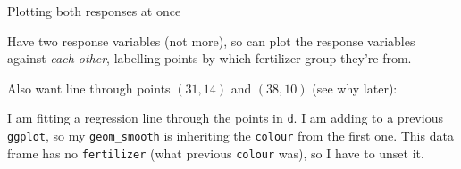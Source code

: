 \begin{frame}[fragile]{Plotting both responses at once}

Have two response variables (not more), so can plot the
response variables against \emph{each other}, labelling points by
which fertilizer group they're from.

\begin{knitrout}
\color{fgcolor}\begin{kframe}
\begin{alltt}
\hlkwb{=}\hlstd{(}\hlopt{+}
  \hlstd{()}
\end{alltt}
\end{kframe}
\end{knitrout}

Also want line through
points $(31,14)$ and $(38,10)$ (see why later):

\begin{knitrout}
\color{fgcolor}\begin{kframe}
\begin{alltt}
\hlkwb{=}\hlstd{(}\hlstd{,}\hlstd{)}
\hlkwb{=}\hlstd{(}\hlstd{,}\hlstd{)}
\hlkwb{=}
\hlkwb{=}\hlopt{+}\hlstd{(}\hlstd{(}\hlstd{=}\hlstd{),}
  \hlstd{=}\hlstd{,}
\end{alltt}
\end{kframe}
\end{knitrout}

I am fitting a regression line through the points in \texttt{d}. I am
adding to a previous \texttt{ggplot}, so my \texttt{geom\_smooth} is
inheriting the \texttt{colour} from the first one. This data frame has
no \texttt{fertilizer} (what previous \texttt{colour} was), so I have to unset it.
  
\end{frame}

